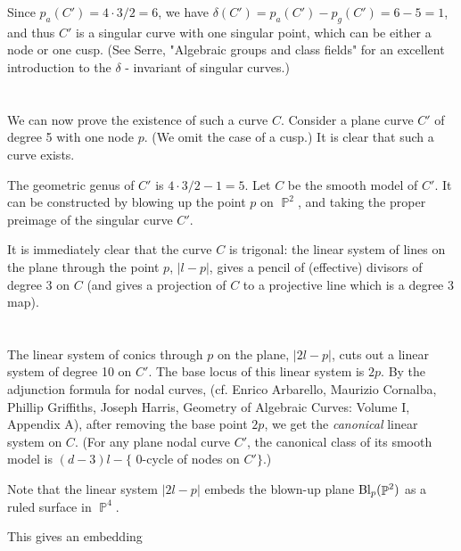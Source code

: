 \documentclass{amsart} %
\newcommand{\<}{\langle }
\renewcommand{\>}{\rangle }
\newcommand{\PP}{\mathop{\mathbb{P}}\nolimits}
\newcommand{\Bl}{\mathop{\rm Bl}\nolimits}  %
\begin{document}
Since $p_a(C') = 4 \cdot 3 / 2 = 6$, we have $ \delta(C') = p_a(C') - p_g(C') = 
6 - 5 = 1$, and thus $C'$ is a singular curve with one singular point,
which can be either a node or one cusp.
(See Serre, "Algebraic groups and class fields" for an excellent introduction to the $\delta$ - invariant of
singular curves.)


\section{}%
\label{sec:}


We can now prove the existence of such a curve $C$. Consider a plane curve $C'$
of degree 5 with one node $p$. (We omit the case of a cusp.) It is clear that such a curve exists.

The geometric genus of $C'$ is $4 \cdot 3 / 2 - 1 = 5$. Let $C$ be the smooth model of $C'$.
It can be constructed by blowing up the point $p$ on $\PP^2$, 
and taking the proper preimage of the singular curve $C'$.

It is immediately clear that the curve $C$ is trigonal: the linear system of lines
on the plane through the point $p$, $|l - p|$, gives a pencil of (effective) divisors
of degree 3 on $C$ (and gives a projection of $C$ to a projective line
which is a degree 3 map).

\section{}%
\label{sec:}

The linear system of conics through $p$ on the plane, $|2 l - p|$,
cuts out a linear system of degree 10 on $C'$. The base locus of this linear 
system is $2p$. By the adjunction formula for nodal curves, (cf. 
Enrico Arbarello, Maurizio Cornalba, Phillip Griffiths, Joseph Harris,
Geometry of Algebraic Curves: Volume I, Appendix A), after removing the base point $2p$, 
we get the {\it canonical } linear system on $C$. (For any plane nodal curve $C'$,
the canonical class of its smooth model is $ (d-3) l - \{ $ 0-cycle of nodes on  $C' \} $.)

Note that the linear system $|2l - p|$ embeds the blown-up plane $\Bl_p(\PP^2)$ as a ruled surface in $\PP^4$.

This gives an embedding
\end{document}
